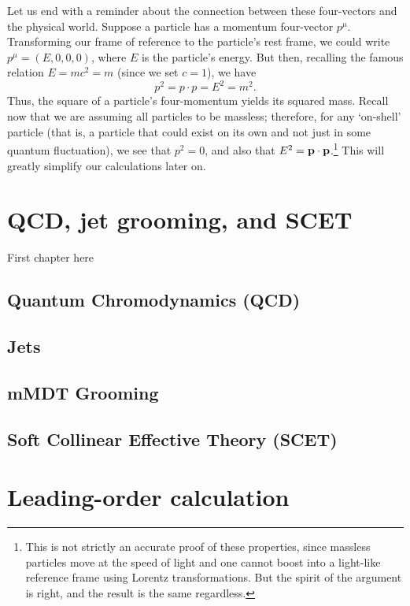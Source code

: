 \documentclass[12pt,twoside]{reedthesis}
\begin{document}
	Let us end with a reminder about the connection between these four-vectors and the physical world. Suppose a particle has a momentum four-vector $p^\mu$. Transforming our frame of reference to the particle's rest frame, we could write $p^\mu = (E, 0, 0, 0)$, where $E$ is the particle's energy. But then, recalling the famous relation $E = mc^2 = m$ (since we set $c = 1$), we have
	\begin{equation}
		p^2 = p \cdot p = E^2 = m^2.
	\end{equation}
	Thus, the square of a particle's four-momentum yields its squared mass. Recall now that we are assuming all particles to be massless; therefore, for any `on-shell' particle (that is, a particle that could exist on its own and not just in some quantum fluctuation), we see that $p^2 = 0$, and also that $E^2 = \vb{p} \cdot \vb{p}$.\footnote{This is not strictly an accurate proof of these properties, since massless particles move at the speed of light and one cannot boost into a light-like reference frame using Lorentz transformations. But the spirit of the argument is right, and the result is the same regardless.} This will greatly simplify our calculations later on.

	

\chapter{QCD, jet grooming, and SCET}
	
	First chapter here

	\section{Quantum Chromodynamics (QCD)}

	\section{Jets}

	\section{mMDT Grooming}

	\section{Soft Collinear Effective Theory (SCET)}


\chapter{Leading-order calculation}
\end{document}
